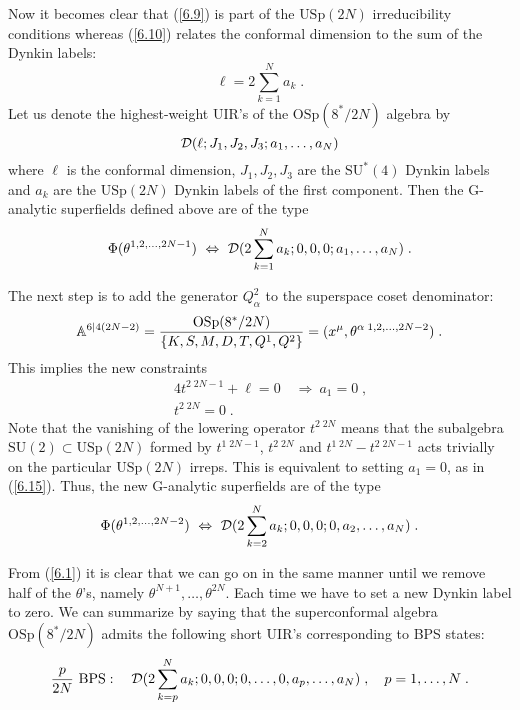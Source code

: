 \documentclass[a4paper,12pt]{article}
\begin{document}
Now it becomes clear that (\ref{6.9}) is part of the 
$\mbox{USp}(2N)$ irreducibility conditions whereas (\ref{6.10}) 
relates the conformal dimension to the sum of the Dynkin labels: 
\begin{equation}\label{6.12}
  \ell = 2\sum_{k=1}^N a_k\;.
\end{equation}
Let us denote the highest-weight UIR's of the $\mbox{OSp}(8^*/2N)$ 
algebra by 
$$
{\cal D}(\ell;J_1,J_2,J_3;a_1,\ldots,a_N) 
$$
where $\ell$ is the conformal dimension, $J_1,J_2,J_3$ are the 
$\mbox{SU}^*(4)$ Dynkin labels and $a_k$ are the $\mbox{USp}(2N)$  
Dynkin labels of the first component. Then the G-analytic 
superfields defined above are of the type 
\begin{equation}\label{6.13}
 \Phi(\theta^{1,2,\ldots,2N-1}) \ \Leftrightarrow \ 
{\cal D}(2\sum_{k=1}^N a_k;0,0,0;a_1,\ldots,a_N)\;. 
\end{equation}

The next step is to add the generator $Q^2_\alpha$ to the 
superspace coset denominator:
\begin{equation}
{\mathbb A}^{6\vert 4(2N-2)} = {\mbox{OSp}(8^*/2N)\over 
\{K,S,M,D,T,Q^1,Q^2\}} = (x^\mu,\theta^{\alpha\; 
1,2,\ldots,2N-2})\;. \label{6.14} 
\end{equation}  
This implies the new constraints
\begin{eqnarray}
  &&4t^{2\; 2N-1}+\ell=0\quad \Rightarrow \  a_1=0\;,  \label{6.15}\\
  && t^{2\; 2N}=0\;. \label{6.16}
\end{eqnarray}
Note that the vanishing of the lowering operator $t^{2\; 2N}$ 
means that the subalgebra $\mbox{SU}(2)\subset \mbox{USp}(2N)$ 
formed by $t^{1\; 2N-1}$, $t^{2\; 2N}$ and $t^{1\; 2N}-t^{2\; 
2N-1}$ acts trivially on the particular $\mbox{USp}(2N)$ irreps. 
This is equivalent to setting $a_1=0$, as in (\ref{6.15}). Thus, 
the new G-analytic superfields are of the type 
\begin{equation}\label{6.17}
 \Phi(\theta^{1,2,\ldots,2N-2}) \ \Leftrightarrow \ 
{\cal D}(2\sum_{k=2}^N a_k;0,0,0;0,a_2,\ldots,a_N)\;. 
\end{equation} 
 

From (\ref{6.1}) it is clear that we can go on in the same manner 
until we remove half of the $\theta$'s, namely 
$\theta^{N+1},\ldots,\theta^{2N}$. Each time we have to set a new 
Dynkin label to zero. We can summarize by saying that the 
superconformal algebra $\mbox{OSp}(8^*/2N)$ admits the following 
short UIR's corresponding to BPS states: 
\begin{equation}\label{6.18}
  {p\over 2N}\mbox{ BPS}:\quad 
{\cal D}(2\sum_{k=p}^N a_k;0,0,0;0,\ldots,0,a_p,\ldots,a_N)\;, 
\quad p=1,\ldots,N\;. 
\end{equation}
\end{document}
